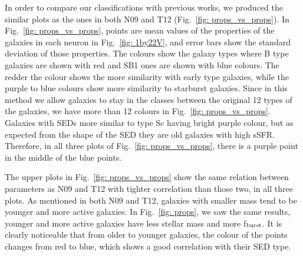 \documentclass[useAMS,usenatbib]{mn2e}
\begin{document}
        In order to compare our classifications with previous works, we produced the similar plots as the ones in both N09 and T12 (Fig.~\ref{fig: props_vs_props}).
        In Fig.~\ref{fig: props_vs_props}, points are mean values of the properties of the galaxies in each neuron in Fig.~\ref{fig: 1by22V}, and error bars show the standard deviation of those properties. 
        The colours show the galaxy types where B type galaxies are shown with red and SB1 ones are shown with blue colours.
        The redder the colour shows the more similarity with early type galaxies, while the purple to blue colours show more similarity to starburst galaxies.
        Since in this method we allow galaxies to stay in the classes between the original 12 types of the galaxies, we have more than 12 colours in Fig.~\ref{fig: props_vs_props}.
        Galaxies with SEDs more similar to type Sc having bright purple colour, but as expected from the shape of the SED they are old galaxies with high sSFR.
        Therefore, in all three plots of Fig.~\ref{fig: props_vs_props}, there is a purple point in the middle of the blue points.
        
        The upper plots in Fig.~\ref{fig: props_vs_props} show the same relation between parameters as N09 and T12 with tighter correlation than those two, in all three plots.
        As mentioned in both N09 and T12, galaxies with smaller mass tend to be younger and more active galaxies.
        In Fig.~\ref{fig: props}, we saw the same results, younger and more active galaxies have less stellar mass and more f$_{\rm {burst}}$.
        It is clearly noticeable that from older to younger galaxies, the colour of the points changes from red to blue, which shows a good correlation with their SED type.
        
\end{document}
